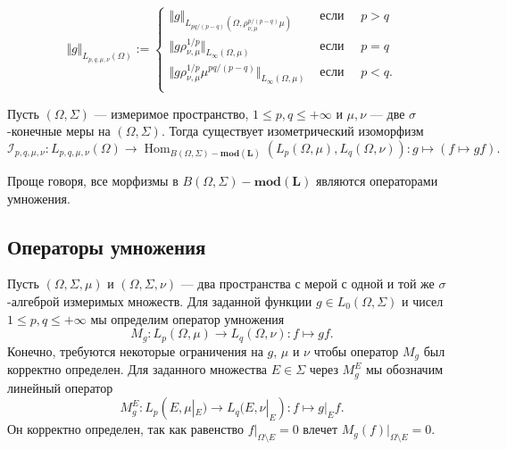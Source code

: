$$
\Vert g\Vert_{L_{p,q,\mu,\nu}(\Omega)}:=
\begin{cases}
    \Vert g\Vert_{L_{pq/(p-q)}(\Omega,\rho_{\nu,\mu}^{p/(p-q)}\mu)}         &
    \text{ если }\quad p>q                                                  \\
    \Vert g\rho_{\nu,\mu}^{1/p}\Vert_{L_{\infty}(\Omega,\mu)}               &
    \text{ если }\quad p=q                                                  \\
    \Vert g\rho_{\nu,\mu}^{1/p}\mu^{pq/(p-q)}\Vert_{L_{\infty}(\Omega,\mu)} &
    \text{ если }\quad p<q.                                                 \\
\end{cases}
$$

\begin{theorem}\label{LpModMorphCharac} Пусть $(\Omega,\Sigma)$ --- измеримое пространство,
$1\leq p,q\leq +\infty$ и $\mu,\nu$ --- две $\sigma$-конечные меры на 
$(\Omega, \Sigma)$. Тогда существует изометрический изоморфизм
$$
\mathcal{I}_{p,q,\mu,\nu}:L_{p,q,\mu,\nu}(\Omega)
    \to
\operatorname{Hom}_{
    B(\Omega,\Sigma)-\mathbf{mod(L)}
}(L_p(\Omega,\mu),L_q(\Omega,\nu)):
g\mapsto (f\mapsto g f).
$$
\end{theorem}

Проще говоря, все морфизмы в $B(\Omega,\Sigma)-\mathbf{mod(L)}$ являются
операторами умножения.


\subsection{Операторы умножения}\label{SubSectionMultiplicationOperators}

Пусть $(\Omega,\Sigma,\mu)$ и $(\Omega,\Sigma,\nu)$ --- два пространства с мерой
с одной и той же $\sigma$-алгеброй измеримых множеств. Для заданной функции
$g\in L_0(\Omega,\Sigma)$ и чисел $1\leq p,q\leq +\infty$ мы определим оператор
умножения
$$
M_g:L_p(\Omega,\mu)\to L_q(\Omega,\nu): f\mapsto g f.
$$ 
Конечно, требуются некоторые ограничения на $g$, $\mu$ и $\nu$ чтобы оператор
$M_g$ был корректно определен. Для заданного множества $E\in\Sigma$ через
$M_g^E$ мы обозначим линейный оператор
$$
M_g^E:L_p(E,\mu|_E)\to L_q(E,\nu|_E):f\mapsto g|_E f.
$$
Он корректно определен, так как равенство $f|_{\Omega\setminus E}=0$ влечет
$M_g(f)|_{\Omega\setminus E}=0$. 


